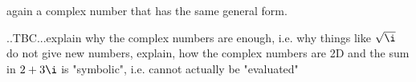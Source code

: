 again a complex number that has the same general form.


..TBC...explain why the complex numbers are enough, i.e. why things like $\sqrt{\i}$ do not give new numbers, explain, how the complex numbers are 2D and the sum in $2 + 3 \i$ is "symbolic", i.e. cannot actually be "evaluated"




